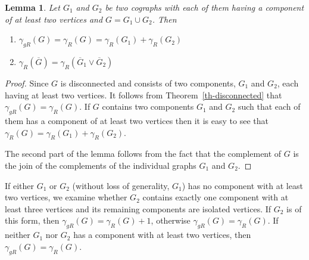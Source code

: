 \documentclass[preprint,12pt]{elsarticle}
\newtheorem{lemma}{Lemma}
\begin{document}
\begin{lemma}\label{cograph-union}
    Let $G_1$ and $G_2$ be two cographs with each of them having a component of at least two vertices and  $G = G_1 \cup G_2$. Then 
    \begin{enumerate}
        \item $\gamma_{gR}(G)=\gamma_{R}(G)=\gamma_{R}(G_1)+\gamma_{R}(G_2)$
        \item $\gamma_{R}(\overline G)=\gamma_{R}(\overline G_1 \vee \overline G_2)$
    \end{enumerate}
\end{lemma}
\begin{proof}
    Since $G$ is disconnected and consists of two components, $G_1$ and $G_2$, each having at least two vertices. It follows from Theorem~\ref{th-disconnected} that $\gamma_{gR}(G)=\gamma_{R}(G)$. If $G$ contains two components $G_1$ and $G_2$ such that each of them has a component of at least two vertices then it is easy to see that $\gamma_{R}(G)=\gamma_{R}(G_1)+\gamma_{R}(G_2)$.

    The second part of the lemma follows from the fact that the complement of $G$ is the join of the complements of the individual graphs $G_1$ and $G_2$. 
\end{proof}

If either $G_1$ or $G_2$ (without loss of generality, $G_1$) has no component with at least two vertices, we examine whether $G_2$ contains exactly one component with at least three vertices and its remaining components are isolated vertices. If $G_2$ is of this form, then $\gamma_{gR}(G)=\gamma_{R}(G)+1$, otherwise $\gamma_{gR}(G)=\gamma_{R}(G)$. If neither $G_1$ nor $G_2$ has a component with at least two vertices, then $\gamma_{gR}(G)=\gamma_{R}(G)$.
\end{document}
